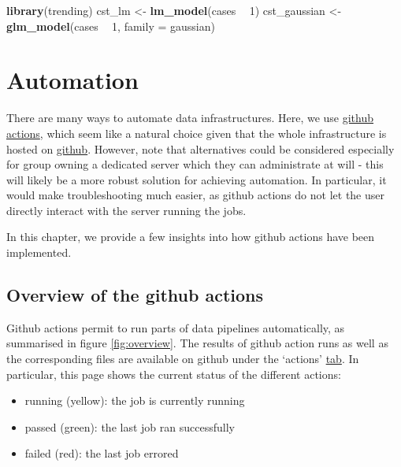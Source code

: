 \documentclass[]{book}
\newenvironment{Shaded}{\begin{snugshade}}{\end{snugshade}}
\newcommand{\DataTypeTok}[1]{\textcolor[rgb]{0.13,0.29,0.53}{#1}}
\newcommand{\DecValTok}[1]{\textcolor[rgb]{0.00,0.00,0.81}{#1}}
\newcommand{\KeywordTok}[1]{\textcolor[rgb]{0.13,0.29,0.53}{\textbf{#1}}}
\newcommand{\NormalTok}[1]{#1}
\newcommand{\OperatorTok}[1]{\textcolor[rgb]{0.81,0.36,0.00}{\textbf{#1}}}
\newcommand{\StringTok}[1]{\textcolor[rgb]{0.31,0.60,0.02}{#1}}
\providecommand{\tightlist}{%
  \setlength{\itemsep}{0pt}\setlength{\parskip}{0pt}}
\begin{document}
\begin{Shaded}
\begin{Highlighting}[]

\KeywordTok{library}\NormalTok{(trending)}
\NormalTok{cst_lm <-}\StringTok{ }\KeywordTok{lm_model}\NormalTok{(cases }\OperatorTok{~}\StringTok{ }\DecValTok{1}\NormalTok{)}
\NormalTok{cst_gaussian <-}\StringTok{ }\KeywordTok{glm_model}\NormalTok{(cases }\OperatorTok{~}\StringTok{ }\DecValTok{1}\NormalTok{, }\DataTypeTok{family =}\NormalTok{ gaussian)}
\end{Highlighting}
\end{Shaded}

\hypertarget{automation}{%
\chapter{Automation}\label{automation}}

There are many ways to automate data infrastructures. Here, we use \href{https://docs.github.com/en/actions}{github
actions}, which seem like a natural choice
given that the whole infrastructure is hosted on
\href{https://github.com/whocov/trend_analysis_public}{github}. However, note that
alternatives could be considered especially for group owning a dedicated server
which they can administrate at will - this will likely be a more robust solution
for achieving automation. In particular, it would make troubleshooting much
easier, as github actions do not let the user directly interact with the server
running the jobs.

In this chapter, we provide a few insights into how github actions have been
implemented.

\hypertarget{overview-of-the-github-actions}{%
\section{Overview of the github actions}\label{overview-of-the-github-actions}}

Github actions permit to run parts of data pipelines automatically, as
summarised in figure \ref{fig:overview}. The results of github action runs as
well as the corresponding files are available on github under the `actions'
\href{https://github.com/whocov/trend_analysis_public/actions}{tab}. In particular,
this page shows the current status of the different actions:

\begin{itemize}
\tightlist
\item
  running (yellow): the job is currently running
\item
  passed (green): the last job ran successfully
\item
  failed (red): the last job errored
\end{itemize}
\end{document}
